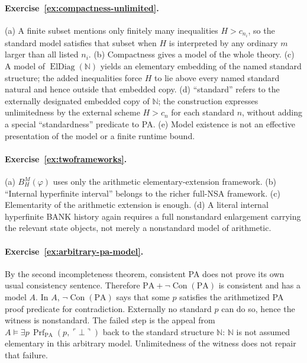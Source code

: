 \documentclass[11pt,openany]{book}
\theoremstyle{definition}
\theoremstyle{remark}
\newcommand{\N}{\mathbb{N}}
\newcommand{\Prf}{\operatorname{Prf}}
\begin{document}
\paragraph{Exercise~\ref{ex:compactness-unlimited}.}
(a) A finite subset mentions only finitely many inequalities $H>c_{n_i}$, so the standard model satisfies that subset when $H$ is interpreted by any ordinary $m$ larger than all listed $n_i$. (b) Compactness gives a model of the whole theory. (c) A model of $\operatorname{ElDiag}(\N)$ yields an elementary embedding of the named standard structure; the added inequalities force $H$ to lie above every named standard natural and hence outside that embedded copy. (d) ``standard'' refers to the externally designated embedded copy of $\N$; the construction expresses unlimitedness by the external scheme $H>c_n$ for each standard $n$, without adding a special ``standardness'' predicate to PA. (e) Model existence is not an effective presentation of the model or a finite runtime bound.

\paragraph{Exercise~\ref{ex:twoframeworks}.}
(a) $B_H^M(\varphi)$ uses only the arithmetic elementary-extension framework. (b) ``Internal hyperfinite interval'' belongs to the richer full-NSA framework. (c) Elementarity of the arithmetic extension is enough. (d) A literal internal hyperfinite BANK history again requires a full nonstandard enlargement carrying the relevant state objects, not merely a nonstandard model of arithmetic.

\paragraph{Exercise~\ref{ex:arbitrary-pa-model}.}
By the second incompleteness theorem, consistent PA does not prove its own usual consistency sentence. Therefore $\mathrm{PA}+\neg\operatorname{Con}(\mathrm{PA})$ is consistent and has a model $A$. In $A$, $\neg\operatorname{Con}(\mathrm{PA})$ says that some $p$ satisfies the arithmetized PA proof predicate for contradiction. Externally no standard $p$ can do so, hence the witness is nonstandard. The failed step is the appeal from $A\models\exists p\,\Prf_{\mathrm{PA}}(p,\ulcorner\bot\urcorner)$ back to the standard structure $\N$: $\N$ is not assumed elementary in this arbitrary model. Unlimitedness of the witness does not repair that failure.
\end{document}
